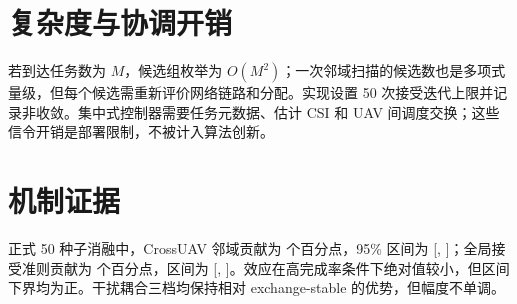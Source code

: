 \section{复杂度与协调开销}
若到达任务数为 $M$，候选组枚举为 $O(M^2)$；一次邻域扫描的候选数也是多项式量级，但每个候选需重新评价网络链路和分配。实现设置 50 次接受迭代上限并记录非收敛。集中式控制器需要任务元数据、估计 CSI 和 UAV 间调度交换；这些信令开销是部署限制，不被计入算法创新。

\section{机制证据}
正式 50 种子消融中，CrossUAV 邻域贡献为 \InnovationOneCrossGainPP{} 个百分点，95\% 区间为 [\InnovationOneCrossCILowPP{}, \InnovationOneCrossCIHighPP{}]；全局接受准则贡献为 \InnovationOneAcceptanceGainPP{} 个百分点，区间为 [\InnovationOneAcceptanceCILowPP{}, \InnovationOneAcceptanceCIHighPP{}]。效应在高完成率条件下绝对值较小，但区间下界均为正。干扰耦合三档均保持相对 exchange-stable 的优势，但幅度不单调。
